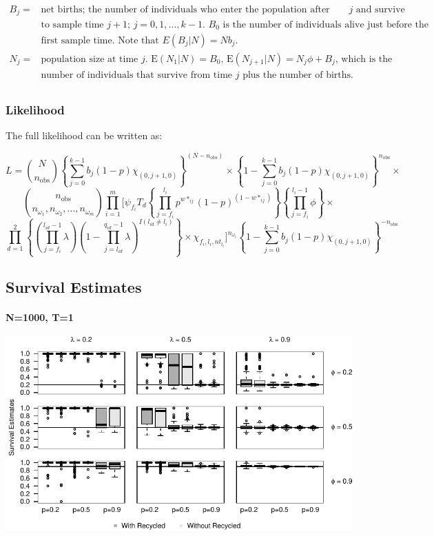 \documentclass[]{article}
\let\oldparagraph\paragraph
\renewcommand{\paragraph}[1]{\oldparagraph{#1}\mbox{}}
\begin{document}
\[\begin{array}{ll}
     B_j= & \text{net births; the number of individuals who enter the population after sample time $j$ and survive}\\
    & \text{to sample time $j+1$; $j=0,1,...,k-1$. $B_0$ is the number of individuals alive just before the}\\
    & \text{first sample time. Note that $E(B_j|N)=Nb_j$. }\\                   
    N_j= & \text{population size at time $j$. E$(N_1|N)=B_0$, E$(N_{j+1}|N)=N_j\phi +B_j$, which is the }\\
    & \text{number of individuals that survive from time $j$ plus the number of births.}\\
  \end{array}
\]

\subsubsection{Likelihood}\label{complete-likelihood}

The full likelihood can be written as:

\[
L=\binom{N}{n_\text{obs}} \left\{ \sum_{j=0}^{k-1} b_j(1-p)\chi_{(0,j+1,0)} \right\} ^{(N-n_\text{obs})} \times \left\{ 1- \sum_{j=0}^{k-1} b_j(1-p)\chi_{(0,j+1,0)} \right\} ^{n_\text{obs}} \times
\] \[
\binom{n_\text{obs}}{n_{\omega_1},n_{\omega_2},...,n_{\omega_m}} \prod_{i=1}^{m} \Bigg[ \psi_{f_i} T_d \left\{ \prod_{j=f_i}^{l_i} p^{w*_{ij}} (1-p)^{(1-w*_{ij})} \right\} \left\{ \prod_{j=f_i}^{l_i-1} \phi \right\} \times 
\] \[
\prod_{d=1}^{2} \left\{ \left( \prod_{j=f_i}^{l_{id}-1} \lambda \right) \left(1-\prod_{j=l_{id}}^{q_{id}-1} \lambda \right)^{I(l_{id} \neq l_i)} \right\} \times \chi_{f_i, l_i, nt_{l_i}} \Bigg]^{n_{\omega_i}} 
\left\{ 1- \sum_{j=0}^{k-1} b_j(1-p)\chi_{(0,j+1,0)} \right\} ^{-n_\text{obs}}
\]

\newpage 

\subsection{Survival Estimates}\label{survival-estimates}

\paragraph{N=1000, T=1}\label{n1000-t1}

\includegraphics{Appendix_BW_files/figure-latex/figure1_survival_GJSTL1-1.pdf}
\end{document}
